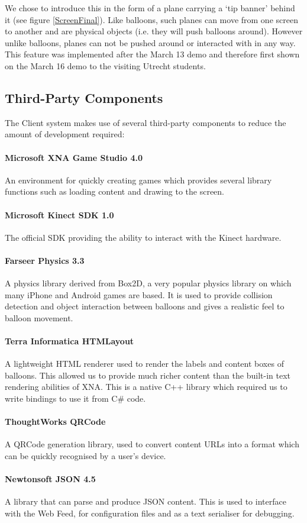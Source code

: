 We chose to introduce this in the form of a plane carrying 
a `tip banner' behind it (see figure \ref{ScreenFinal}). Like balloons, such 
planes can move from one screen to another and are physical objects (i.e. they 
will push balloons around). However unlike balloons, planes can not be pushed 
around or interacted with in any way. This feature was implemented after
the March 13 demo and therefore first shown on the March 16 demo to the visiting 
Utrecht students.

\clearpage{}

\subsection{Third-Party Components}
The Client system makes use of several third-party components to reduce the 
amount of development required:

\paragraph{Microsoft XNA Game Studio 4.0}
An environment for quickly creating games which provides several library 
functions such as loading content and drawing to the screen. 

\paragraph{Microsoft Kinect SDK 1.0}
The official SDK providing the ability to interact with the Kinect hardware. 

\paragraph{Farseer Physics 3.3}
A physics library derived from Box2D, a very popular physics library on which
many iPhone and Android games are based. It is used to provide collision 
detection and object interaction between balloons and gives a realistic feel to
balloon movement.

\paragraph{Terra Informatica HTMLayout}
A lightweight HTML renderer used to render the labels and content boxes of 
balloons. This allowed us to provide much richer content than the built-in text
rendering abilities of XNA. This is a native C++ library which required us to 
write bindings to use it from C\# code.

\paragraph{ThoughtWorks QRCode}
A QRCode generation library, used to convert content URLs into a format which 
can be quickly recognised by a user's device.

\paragraph{Newtonsoft JSON 4.5}
A library that can parse and produce JSON content. This is used to interface 
with the Web Feed, for configuration files and as a text serialiser for debugging.
